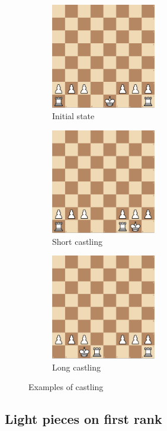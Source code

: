 \documentclass[a4paper,openany]{uantwerpenassignment}
\begin{document}
\begin{figure}[h]
    \centering
    \begin{subfigure}{.3\textwidth}
        \includegraphics[width=130pt]{images/castling1.png}
        \caption{Initial state}
        \label{fig:castling1}
    \end{subfigure}
    \begin{subfigure}{.3\textwidth}
        \includegraphics[width=130pt]{images/castling2.png}
        \caption{Short castling}
        \label{fig:castling2}
    \end{subfigure}
    \begin{subfigure}{.3\textwidth}
        \includegraphics[width=130pt]{images/castling3.png}
        \caption{Long castling}
        \label{fig:castling3}
    \end{subfigure}
    \caption{Examples of castling}
    \label{fig:castling}
\end{figure}

\subsection{Light pieces on first rank}
\end{document}
